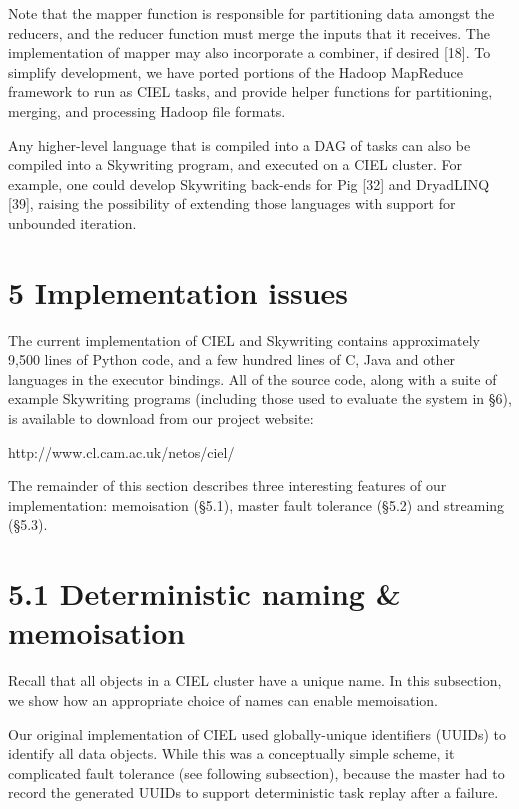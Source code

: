 \documentclass[
]{article}
\begin{document}
Note that the mapper function is responsible for partitioning data
amongst the reducers, and the reducer function must merge the inputs
that it receives. The implementation of mapper may also incorporate a
combiner, if desired {[}18{]}. To simplify development, we have ported
portions of the Hadoop MapReduce framework to run as CIEL tasks, and
provide helper functions for partitioning, merging, and processing
Hadoop file formats.

Any higher-level language that is compiled into a DAG of tasks can also
be compiled into a Skywriting program, and executed on a CIEL cluster.
For example, one could develop Skywriting back-ends for Pig {[}32{]} and
DryadLINQ {[}39{]}, raising the possibility of extending those languages
with support for unbounded iteration.

\section{5 Implementation issues}\label{implementation-issues}

The current implementation of CIEL and Skywriting contains approximately
9,500 lines of Python code, and a few hundred lines of C, Java and other
languages in the executor bindings. All of the source code, along with a
suite of example Skywriting programs (including those used to evaluate
the system in §6), is available to download from our project website:

http://www.cl.cam.ac.uk/netos/ciel/

The remainder of this section describes three interesting features of
our implementation: memoisation (§5.1), master fault tolerance (§5.2)
and streaming (§5.3).

\section{5.1 Deterministic naming \&
memoisation}\label{deterministic-naming-memoisation}

Recall that all objects in a CIEL cluster have a unique name. In this
subsection, we show how an appropriate choice of names can enable
memoisation.

Our original implementation of CIEL used globally-unique identifiers
(UUIDs) to identify all data objects. While this was a conceptually
simple scheme, it complicated fault tolerance (see following
subsection), because the master had to record the generated UUIDs to
support deterministic task replay after a failure.
\end{document}
